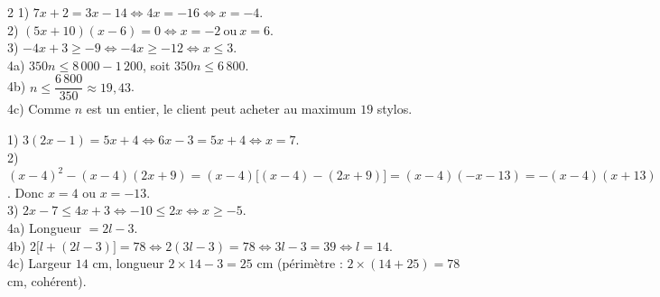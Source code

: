 \begin{multicols}{2}
1) $7x+2=3x-14\iff4x=-16\iff x=-4$.\\
2) $(5x+10)(x-6)=0\iff x=-2\ \text{ou}\ x=6$.\\
3) $-4x+3\ge-9\iff-4x\ge-12\iff x\le3$.\\
4a) $350n\le8\,000-1\,200$, soit $350n\le6\,800$.\\
4b) $n\le\dfrac{6\,800}{350}\approx19{,}43$.\\
4c) Comme $n$ est un entier, le client peut acheter au maximum $19$ stylos.

1) $3(2x-1)=5x+4\iff6x-3=5x+4\iff x=7$.\\
2) $(x-4)^{2}-(x-4)(2x+9)=(x-4)\big[(x-4)-(2x+9)\big]=(x-4)(-x-13)=-(x-4)(x+13)$. Donc
$x=4$ ou $x=-13$.\\
3) $2x-7\le4x+3\iff-10\le2x\iff x\ge-5$.\\
4a) Longueur $=2l-3$.\\
4b) $2\big[l+(2l-3)\big]=78\iff2(3l-3)=78\iff3l-3=39\iff l=14$.\\
4c) Largeur $14$ cm, longueur $2\times14-3=25$ cm (périmètre : $2\times(14+25)=78$ cm,
cohérent).

\end{multicols}
\exercicesBanner
